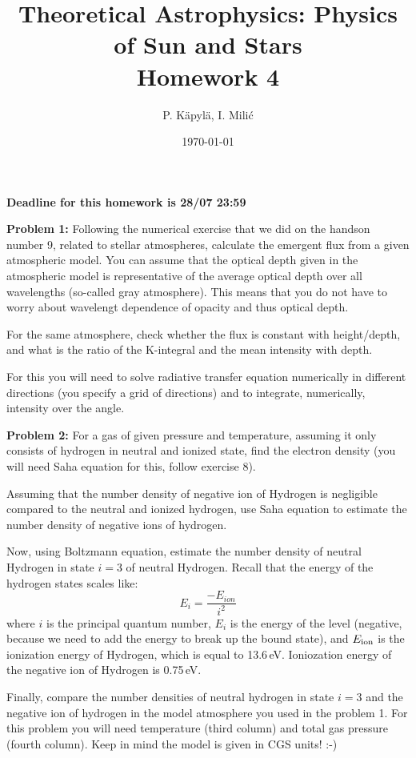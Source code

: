 \documentclass[12pt]{article}
\title{Theoretical Astrophysics: Physics of Sun and Stars\\
Homework 4}
\author{P. K\"{a}pyl\"{a}, I. Mili\'{c}}
\date{\today}
\begin{document}
\maketitle

\textbf{Deadline for this homework is \textbf{28}/07 23:59}

{\bf Problem 1:} Following the numerical exercise that we did on the
handson number 9, related to stellar atmospheres, calculate the
emergent flux from a given atmospheric model. You can assume that the
optical depth given in the atmospheric model is representative of the
average optical depth over all wavelengths (so-called gray
atmosphere). This means that you do not have to worry about wavelengt
dependence of opacity and thus optical depth.

For the same atmosphere, check whether the flux is constant with
height/depth, and what is the ratio of the K-integral and the mean
intensity with depth.

For this you will need to solve radiative transfer equation
numerically in different directions (you specify a grid of directions)
and to integrate, numerically, intensity over the angle.

{\bf Problem 2:} For a gas of given pressure and temperature, assuming
it only consists of hydrogen in neutral and ionized state, find the
electron density (you will need Saha equation for this, follow
exercise 8).

Assuming that the number density of negative ion of Hydrogen is
negligible compared to the neutral and ionized hydrogen, use Saha
equation to estimate the number density of negative ions of hydrogen.

Now, using Boltzmann equation, estimate the number density of neutral
Hydrogen in state $i=3$ of neutral Hydrogen. Recall that the energy of
the hydrogen states scales like:
\begin{equation}
E_i = \frac{-E_{ion}}{i^2}
\end{equation}
where $i$ is the principal quantum number, $E_i$ is the energy of the
level (negative, because we need to add the energy to break up the
bound state), and $E_{\rm ion}$ is the ionization energy of Hydrogen,
which is equal to 13.6\,eV. Ioniozation energy of the negative ion of
Hydrogen is 0.75\,eV.

Finally, compare the number densities of neutral hydrogen in state
$i=3$ and the negative ion of hydrogen in the model atmosphere you
used in the problem 1. For this problem you will need temperature
(third column) and total gas pressure (fourth column). Keep in mind
the model is given in CGS units! :-)
\end{document}
